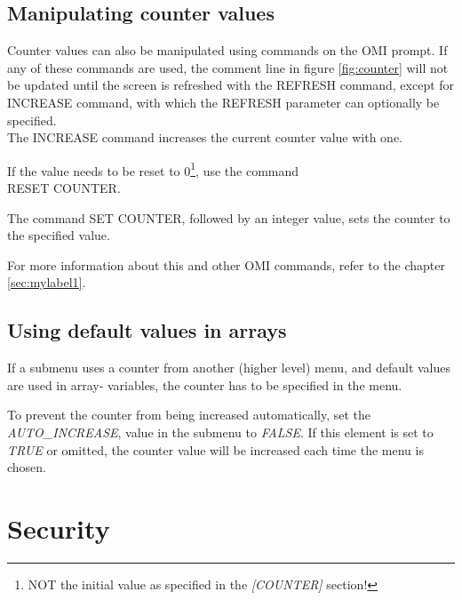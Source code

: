 \documentclass[a4paper]{book}
\newcommand{\vs}{\vspace{3mm}}
\renewcommand{\indent}{\hspace*{5mm}}
\begin{document}
\subsection{Manipulating counter values}
\label{subsubsec:manipulating}

Counter values can also be manipulated using commands on the OMI prompt. If 
any of these commands are used, the comment line in figure \ref{fig:counter} will not be 
updated until the screen is refreshed with the \textsf{REFRESH} command, except for \textsf{INCREASE} 
command, with which the \textsf{REFRESH} parameter can optionally be specified. \\
The \textsf{INCREASE} command increases the current 
counter value with one.

\vs

If the value needs to be reset to 0\footnote{ NOT the initial value as 
specified in the \textsl{[COUNTER]} section!}\label{fnote:resetcounter},
\setcounter{resetfnote}{\value{footnote}}
use the command \\
\indent\textsf{RESET COUNTER}.

The command \textsf{SET COUNTER}, 
followed by an integer value, sets the counter to the specified value.

\vs

For more information about this and other OMI commands, refer to the chapter 
\ref{sec:mylabel1}.

\subsection{Using default values in arrays}
\label{subsubsec:using}

If a submenu uses a counter from another (higher level) menu, and default 
values are used in array- variables, the counter has to be specified in the 
menu.

To prevent the counter from being increased automatically, set the 
\linebreak\textsl{AUTO{\_}INCREASE}, value in 
the submenu to \textsl{FALSE}. If this element is set to \textsl{TRUE} or omitted, the counter 
value will be increased each time the menu is chosen.

\section{Security}
\label{subsec:security}
\end{document}
